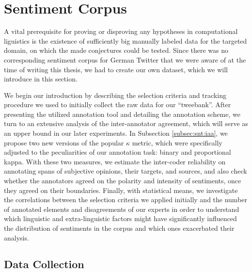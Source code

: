 

\section{Sentiment Corpus}\label{sec:snt:corpus}

A vital prerequisite for proving or disproving any hypotheses in
computational liguistics is the existence of sufficiently big manually
labeled data for the targeted domain, on which the made conjectures
could be tested.  Since there was no corresponding sentiment corpus
for German Twitter that we were aware of at the time of writing this
thesis, we had to create our own dataset, which we will introduce in
this section.

We begin our introduction by describing the selection criteria and
tracking procedure we used to initially collect the raw data for our
``tweebank''.  After presenting the utilized annotation tool and
detailing the annotation scheme, we turn to an extensive analysis of
the inter-annotator agreement, which will serve as an upper bound in
our later experiments.  In Subsection \ref{subsec:snt:iaa}, we propose
two new versions of the popular $\kappa$ metric, which were
specifically adjusted to the peculiarities of our annotation task:
binary and proportional kappa.  With these two measures, we estimate
the inter-coder reliability on annotating spans of subjective
opinions, their targets, and sources, and also check whether the
annotators agreed on the polarity and intensity of sentiments, once
they agreed on their boundaries.  Finally, with statistical means, we
investigate the correlations between the selection criteria we applied
initially and the number of annotated elements and disagreements of
our experts in order to understand which linguistic and
extra-linguistic factors might have significantly influenced the
distribution of sentiments in the corpus and which ones exacerbated
their analysis.

\subsection{Data Collection}

